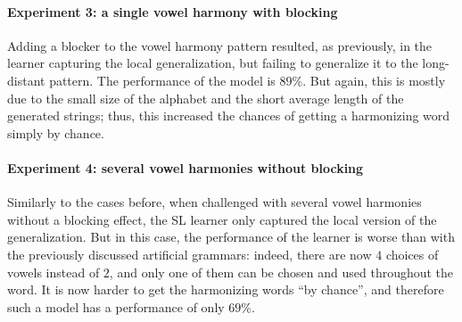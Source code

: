\paragraph{Experiment 3: a single vowel harmony with blocking}

Adding a blocker to the vowel harmony pattern resulted, as previously, in the learner capturing the local generalization, but failing to generalize it to the long-distant pattern.
The performance of the model is $89$\%.
But again, this is mostly due to the small size of the alphabet and the short average length of the generated strings; thus, this increased the chances of getting a harmonizing word simply by chance.

\begin{table}[h!]
\centering
{}
\caption{SL learning of a single harmony with blockers; abstract representation.}
\end{table}


\paragraph{Experiment 4: several vowel harmonies without blocking}

Similarly to the cases before, when challenged with several vowel harmonies without a blocking effect, the SL learner only captured the local version of the generalization.
But in this case, the performance of the learner is worse than with the previously discussed artificial grammars: indeed, there are now $4$ choices of vowels instead of $2$, and only one of them can be chosen and used throughout the word.
It is now harder to get the harmonizing words ``by chance'', and therefore such a model has a performance of only $69$\%.

